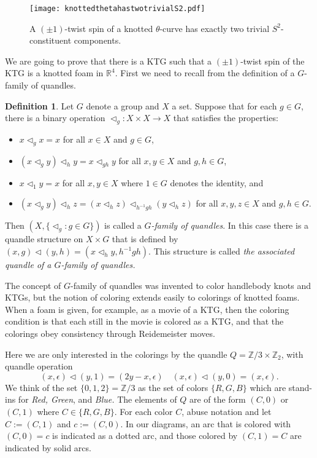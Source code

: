 \documentclass{amsart}
\newcommand{\lt}{\triangleleft}
\newcommand{\Z}{\mathbb{Z}}
\theoremstyle{definition}
\newtheorem{definition}[theorem]{Definition}
\theoremstyle{remark}
\numberwithin{equation}{section}
\begin{document}
\begin{figure}[h]
\texttt{[image: knottedthetahastwotrivialS2.pdf]}
\caption{A $(\pm1)$-twist spin of a knotted $\theta$-curve has exactly two trivial $S^{2}$-constituent components.}
\label{5}
\end{figure}

We are going to prove that there is a KTG such that a $(\pm1)$-twist spin of the KTG is a knotted foam in $\mathbb{R}^{4}$. First we need to recall from \cite{IIJO} the definition of a  $G$-family of quandles.

\begin{definition} Let $G$ denote a group and $X$ a set. Suppose that for each $g\in G$, there is a binary operation $\lt_g:X \times X \rightarrow X$ that satisfies the properties:
\begin{itemize}
\item $x \lt_g x =x$ for all $x\in X$ and $g\in G$,
\item $(x \lt_g y) \lt_h y= x \lt_{gh} y$ for all $x,y \in X$ and $g,h\in G$,
\item $x\lt_1 y = x$ for all $x,y \in X$ where $1\in G$ denotes the identity, and
\item $(x \lt_ g y) \lt_h z = (x \lt_h z) \lt_{{h^{-1} g h}} (y \lt_h z)$ for all $x,y,z \in X$ and $g,h\in G$.
\end{itemize} Then $(X, \{ \lt_g: g\in G \})$ is called a {\it $G$-family of quandles}. In this case there is a quandle structure on $X\times G$ that is defined by $(x,g)\lt(y,h)= (x \lt_h y, h^{-1}g h)$. This structure is called {\it the associated quandle of a $G$-family of quandles.} \end{definition}

The concept of $G$-family of quandles was invented to color handlebody knots and KTGs, but the notion of coloring extends easily to colorings of knotted foams.
When a foam is given, for example, as a movie of a KTG, then the coloring condition is that each still in the movie is colored as a KTG, and that the colorings obey consistency through Reidemeister moves. 

Here we are only interested in the colorings by the quandle $Q=\Z/3 \times \Z_{2}$, with quandle operation 
$$(x, \epsilon) \lt (y,1)=  (2y-x, \epsilon) \quad (x,\epsilon) \lt (y, 0)= (x, \epsilon).$$ 
We think of the set $\{0,1,2\} = \Z/3$ as the set of colors $\{R,G,B\}$ which are stand-ins for {\it Red, Green}, and {\it Blue.} The elements of $Q$ are of the form $(C, 0)$ or $(C,1)$ where $C\in \{R,G,B\}$. For each color $C$, abuse notation and  let $C:=(C,1)$ and $c:=(C,0)$. In our diagrams, an arc that is colored with $(C,0)=c$ is indicated as a dotted arc, and those colored by $(C,1)=C$ are indicated by solid arcs. 
\end{document}

